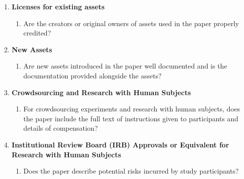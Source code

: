 \documentclass{article}
\begin{document}
\begin{enumerate}
\item {\bf Licenses for existing assets}
    \begin{enumerate}
        \item Are the creators or original owners of assets used in the paper properly credited? 
    \end{enumerate}

\item {\bf New Assets}
    \begin{enumerate}
        \item Are new assets introduced in the paper well documented and is the documentation provided alongside the assets? 
    \end{enumerate}

\item {\bf Crowdsourcing and Research with Human Subjects}
    \begin{enumerate}
        \item For crowdsourcing experiments and research with human subjects, does the paper include the full text of instructions given to participants and details of compensation? 
    \end{enumerate}

\item {\bf Institutional Review Board (IRB) Approvals or Equivalent for Research with Human Subjects}
    \begin{enumerate}
        \item Does the paper describe potential risks incurred by study participants? 
    \end{enumerate}
\end{enumerate}
\end{document}
